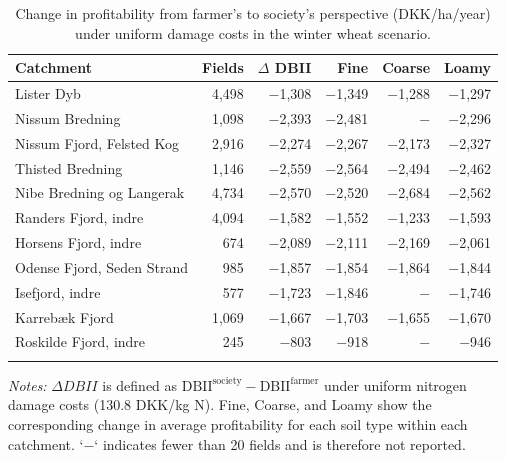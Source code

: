 \documentclass[12pt]{article}
\begin{document}
\begin{table}[H]
\centering
\small
\caption{Change in profitability from farmer's to society's perspective (DKK/ha/year) under uniform damage costs in the winter wheat scenario.}
\label{tab:dbii-change-uniform}
\begin{threeparttable}
\begin{tabular}{lrrrrr}
\toprule
\textbf{Catchment} & \textbf{Fields} & \boldmath$\Delta$ \textbf{DBII} & \textbf{Fine} & \textbf{Coarse} & \textbf{Loamy} \\
\midrule\addlinespace
Lister Dyb                 & 4,498 & $-$1,308 & $-$1,349 & $-$1,288 & $-$1,297 \\
Nissum Bredning            & 1,098 & $-$2,393 & $-$2,481 & $-$ & $-$2,296 \\
Nissum Fjord, Felsted Kog  & 2,916 & $-$2,274 & $-$2,267 & $-$2,173 & $-$2,327 \\
Thisted Bredning           & 1,146 & $-$2,559 & $-$2,564 & $-$2,494 & $-$2,462 \\
Nibe Bredning og Langerak  & 4,734 & $-$2,570 & $-$2,520 & $-$2,684 & $-$2,562 \\
Randers Fjord, indre       & 4,094 & $-$1,582 & $-$1,552 & $-$1,233 & $-$1,593 \\
Horsens Fjord, indre       &   674 & $-$2,089 & $-$2,111 & $-$2,169 & $-$2,061 \\
Odense Fjord, Seden Strand &   985 & $-$1,857 & $-$1,854 & $-$1,864 & $-$1,844 \\
Isefjord, indre            &   577 & $-$1,723 & $-$1,846 & $-$ & $-$1,746 \\
Karrebæk Fjord             & 1,069 & $-$1,667 & $-$1,703 & $-$1,655 & $-$1,670 \\
Roskilde Fjord, indre      &   245 & $-$803   & $-$918   & $-$ & $-$946 \\
\addlinespace
\bottomrule
\end{tabular}
\begin{tablenotes}
\footnotesize
\item \textit{Notes:} $\Delta DBII$ is defined as $\mathrm{DBII^{society}} - \mathrm{DBII^{farmer}}$ under uniform nitrogen damage costs (130.8 DKK/kg N). Fine, Coarse, and Loamy show the corresponding change in average profitability for each soil type within each catchment. `$-$` indicates fewer than 20 fields and is therefore not reported.
\end{tablenotes}
\end{threeparttable}
\end{table}
\end{document}
